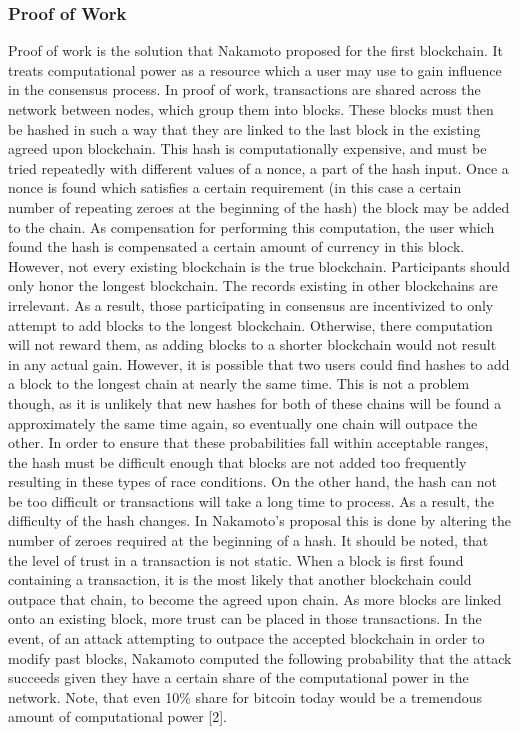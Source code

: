 \documentclass[11pt]{article}
\begin{document}
\subsubsection{Proof of Work}
\label{sec:org1ef7e42}
Proof of work is the solution that Nakamoto proposed for the first blockchain. It treats computational power as a resource which a user may use to gain influence in the consensus process. In proof of work, transactions are shared across the network between nodes, which group them into blocks. These blocks must then be hashed in such a way that they are linked to the last block in the existing agreed upon blockchain. This hash is computationally expensive, and must be tried repeatedly with different values of a nonce, a part of the hash input. Once a nonce is found which satisfies a certain requirement (in this case a certain number of repeating zeroes at the beginning of the hash) the block may be added to the chain. As compensation for performing this computation, the user which found the hash is compensated a certain amount of currency in this block. However, not every existing blockchain is the true blockchain. Participants should only honor the longest blockchain. The records existing in other blockchains are irrelevant. As a result, those participating in consensus are incentivized to only attempt to add blocks to the longest blockchain. Otherwise, there computation will not reward them, as adding blocks to a shorter blockchain would not result in any actual gain. However, it is possible that two users could find hashes to add a block to the longest chain at nearly the same time. This is not a problem though, as it is unlikely that new hashes for both of these chains will be found a approximately the same time again, so eventually one chain will outpace the other. In order to ensure that these probabilities fall within acceptable ranges, the hash must be difficult enough that blocks are not added too frequently resulting in these types of race conditions. On the other hand, the hash can not be too difficult or transactions will take a long time to process. As a result, the difficulty of the hash changes. In Nakamoto's proposal this is done by altering the number of zeroes required at the beginning of a hash. It should be noted, that the level of trust in a transaction is not static. When a block is first found containing a transaction, it is the most likely that another blockchain could outpace that chain, to become the agreed upon chain. As more blocks are linked onto an existing block, more trust can be placed in those transactions. In the event, of an attack attempting to outpace the accepted blockchain in order to modify past blocks, Nakamoto computed the following probability that the attack succeeds given they have a certain share of the computational power in the network. Note, that even 10\% share for bitcoin today would be a tremendous amount of computational power [2].
\end{document}
